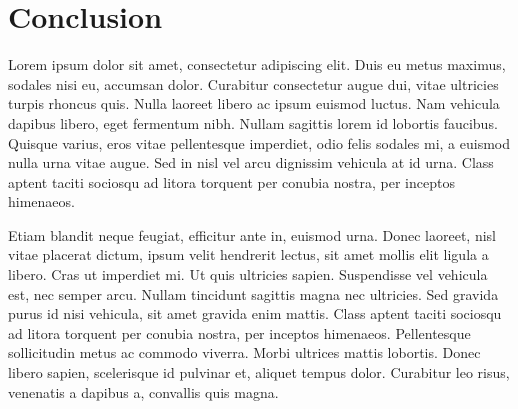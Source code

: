 \chapter{Conclusion}\label{cha:conclusion}

Lorem ipsum dolor sit amet, consectetur adipiscing elit. Duis eu metus maximus, sodales nisi eu, accumsan dolor. Curabitur consectetur augue dui, vitae ultricies turpis rhoncus quis. Nulla laoreet libero ac ipsum euismod luctus. Nam vehicula dapibus libero, eget fermentum nibh. Nullam sagittis lorem id lobortis faucibus. Quisque varius, eros vitae pellentesque imperdiet, odio felis sodales mi, a euismod nulla urna vitae augue. Sed in nisl vel arcu dignissim vehicula at id urna. Class aptent taciti sociosqu ad litora torquent per conubia nostra, per inceptos himenaeos.

Etiam blandit neque feugiat, efficitur ante in, euismod urna. Donec laoreet, nisl vitae placerat dictum, ipsum velit hendrerit lectus, sit amet mollis elit ligula a libero. Cras ut imperdiet mi. Ut quis ultricies sapien. Suspendisse vel vehicula est, nec semper arcu. Nullam tincidunt sagittis magna nec ultricies. Sed gravida purus id nisi vehicula, sit amet gravida enim mattis. Class aptent taciti sociosqu ad litora torquent per conubia nostra, per inceptos himenaeos. Pellentesque sollicitudin metus ac commodo viverra. Morbi ultrices mattis lobortis. Donec libero sapien, scelerisque id pulvinar et, aliquet tempus dolor. Curabitur leo risus, venenatis a dapibus a, convallis quis magna.
